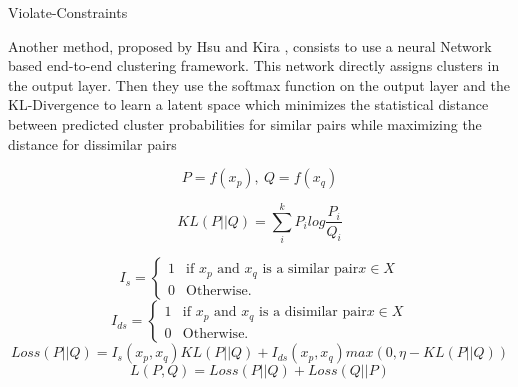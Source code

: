 \begin{algorithm}[!h]
  \caption{Violate-Constraints}
\end{algorithm}
Another method, proposed by Hsu and Kira \cite{2015arXiv151106321H}, consists to 
use a neural Network based end-to-end clustering framework. This network 
directly assigns clusters in the output layer. Then they use the softmax 
function on the output layer and the KL-Divergence to learn a latent space 
which minimizes the statistical distance between predicted cluster probabilities 
for similar pairs while maximizing the distance for dissimilar pairs

\begin{equation*}
  P = f(x_p), ~ Q = f(x_q)
\end{equation*}

\begin{equation*}
  KL(P||Q) = \sum_i^k P_ilog\frac{P_i}{Q_i}
\end{equation*}

\begin{equation*}
  I_s = \left\{
\begin{array}{ll}
  1 & \mbox{if $x_p$ and $x_q$ is a similar pair} x \in X\\
  0 & \mbox{Otherwise.}
\end{array}
\right.
\end{equation*}
%
\begin{equation*}
  I_{ds} = \left\{
\begin{array}{ll}
  1 & \mbox{if $x_p$ and $x_q$ is a disimilar pair} x \in X\\
  0 & \mbox{Otherwise.}
\end{array}
\right.
\end{equation*}
\begin{equation*}
  Loss(P || Q) = I_s(x_p, x_q)KL(P || Q) + I_{ds}(x_p, x_q)max(0,
  \eta-KL(P||Q))
\end{equation*}
\begin{equation*}
  L(P,Q) = Loss(P || Q) + Loss(Q || P)
\end{equation*}

